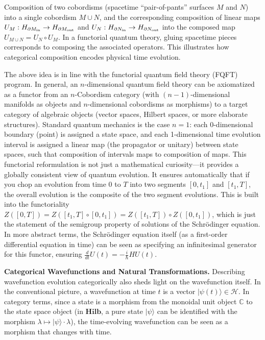 \documentclass[12pt]{article}
\begin{document}
\smallskip
Composition of two cobordisms (spacetime ``pair-of-pants'' surfaces $M$ and $N$) into a single cobordism $M \cup N$, and the corresponding composition of linear maps $U_M: H_{\partial M_{\rm in}} \to H_{\partial M_{\rm out}}$ and $U_N: H_{\partial N_{\rm in}} \to H_{\partial N_{\rm out}}$ into the composed map $U_{M\cup N} = U_N \circ U_M$. In a functorial quantum theory, gluing spacetime pieces corresponds to composing the associated operators. This illustrates how categorical composition encodes physical time evolution.

The above idea is in line with the functorial quantum field theory (FQFT) program. In general, an $n$-dimensional quantum field theory can be axiomatized as a functor from an $n$-Cobordism category (with $(n-1)$-dimensional manifolds as objects and $n$-dimensional cobordisms as morphisms) to a target category of algebraic objects (vector spaces, Hilbert spaces, or more elaborate structures). Standard quantum mechanics is the case $n=1$: each 0-dimensional boundary (point) is assigned a state space, and each 1-dimensional time evolution interval is assigned a linear map (the propagator or unitary) between state spaces, such that composition of intervals maps to composition of maps. This functorial reformulation is not just a mathematical curiosity---it provides a globally consistent view of quantum evolution. It ensures automatically that if you chop an evolution from time 0 to $T$ into two segments $[0,t_1]$ and $[t_1,T]$, the overall evolution is the composite of the two segment evolutions. This is built into the functoriality $Z([0,T]) = Z([t_1,T] \circ [0,t_1]) = Z([t_1,T]) \circ Z([0,t_1])$, which is just the statement of the semigroup property of solutions of the Schrödinger equation. In more abstract terms, the Schrödinger equation itself (as a first-order differential equation in time) can be seen as specifying an infinitesimal generator for this functor, ensuring $\tfrac{d}{dt}U(t) = -\tfrac{i}{\hbar} H U(t)$.

\medskip
\textbf{Categorical Wavefunctions and Natural Transformations.} Describing wavefunction evolution categorically also sheds light on the wavefunction itself. In the conventional picture, a wavefunction at time $t$ is a vector $\lvert \psi(t)\rangle \in \mathcal{H}$. In category terms, since a state is a morphism from the monoidal unit object $\mathbb{C}$ to the state space object (in $\mathbf{Hilb}$, a pure state $\lvert\psi\rangle$ can be identified with the morphism $\lambda \mapsto \lvert\psi\rangle \cdot \lambda$), the time-evolving wavefunction can be seen as a morphism that changes with time.
\end{document}
